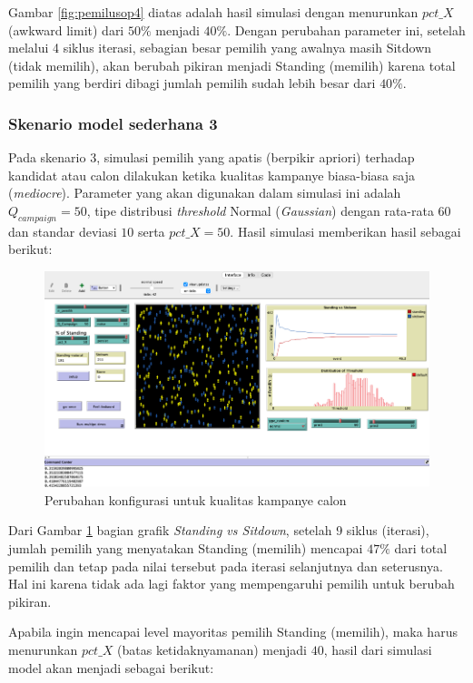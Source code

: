 Gambar \ref{fig:pemilusop4} diatas adalah hasil simulasi dengan menurunkan $pct\_X$ (awkward limit) dari $50\%$ menjadi $40\%$. Dengan perubahan parameter ini, setelah melalui 4 siklus iterasi, sebagian besar pemilih yang awalnya masih Sitdown (tidak memilih), akan berubah pikiran menjadi Standing (memilih) karena total pemilih yang berdiri dibagi jumlah pemilih sudah lebih besar dari $40\%$.

\subsubsection{Skenario model sederhana 3}

Pada skenario 3, simulasi pemilih yang apatis (berpikir apriori) terhadap kandidat atau calon dilakukan ketika kualitas kampanye biasa-biasa saja (\textit{mediocre}). Parameter yang akan digunakan dalam simulasi ini adalah $Q_{campaign}=50$, tipe distribusi \textit{threshold} Normal (\textit{Gaussian}) dengan rata-rata $60$ dan standar deviasi $10$ serta $pct\_X=50$. Hasil simulasi memberikan hasil sebagai berikut:

\begin{figure}[H]
\centering
\includegraphics[width=\linewidth]{images/ch03/pemilusop5}
\caption{Perubahan konfigurasi untuk kualitas kampanye calon}
\label{fig:pemilusop5}
\end{figure}

Dari Gambar \ref{fig:pemilusop5} bagian grafik \textit{Standing vs Sitdown}, setelah 9 siklus (iterasi), jumlah pemilih yang menyatakan Standing (memilih) mencapai $47\%$ dari total pemilih dan tetap pada nilai tersebut pada iterasi selanjutnya dan seterusnya. Hal ini karena tidak ada lagi faktor yang mempengaruhi pemilih untuk berubah pikiran.

Apabila ingin mencapai level mayoritas pemilih Standing (memilih), maka harus menurunkan $pct\_X$ (batas ketidaknyamanan) menjadi $40$, hasil dari simulasi model akan menjadi sebagai berikut:

